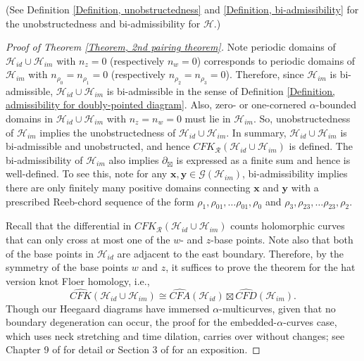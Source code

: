 \documentclass{amsart}
\theoremstyle{definition}
\theoremstyle{remark}
\numberwithin{equation}{section}
\numberwithin{equation}{section} \makeatletter
\begin{document}
\SecondPairingTheorem*
(See Definition \ref{Definition, unobstructedness} and \ref{Definition, bi-admissibility} for the unobstructedness and bi-admissibility for $\mathcal{H}$.)
\begin{proof}[Proof of Theorem \ref{Theorem, 2nd pairing theorem}]
Note periodic domains of $\mathcal{H}_{id}\cup \mathcal{H}_{im}$ with $n_z=0$ (respectively $n_w=0$) corresponds to periodic domains of $\mathcal{H}_{im}$ with $n_{\rho_0}=n_{\rho_1}=0$ (respectively $n_{\rho_2}=n_{\rho_3}=0$). Therefore,   since $\mathcal{H}_{im}$ is bi-admissible, $\mathcal{H}_{id}\cup \mathcal{H}_{im}$ is bi-admissible in the sense of Definition \ref{Definition, admissibility for doubly-pointed diagram}. Also, zero- or one-cornered $\alpha$-bounded domains in $\mathcal{H}_{id}\cup \mathcal{H}_{im}$ with $n_z=n_w=0$ must lie in $\mathcal{H}_{im}$. So, unobstructedness of $\mathcal{H}_{im}$ implies the unobstructedness of $\mathcal{H}_{id}\cup \mathcal{H}_{im}$. In summary, $\mathcal{H}_{id}\cup \mathcal{H}_{im}$ is bi-admissible and unobstructed, and hence $CFK_{\mathcal{R}}(\mathcal{H}_{id}\cup \mathcal{H}_{im})$ is defined. The bi-admissibility of $\mathcal{H}_{im}$ also implies $\partial_\boxtimes$ is expressed as a finite sum and hence is well-defined. To see this, note for any $\bm{x},\bm{y}\in\mathcal{G}(\mathcal{H}_{im})$, bi-admissibility implies there are only finitely many positive domains connecting $\bm{x}$ and $\bm{y}$ with a prescribed Reeb-chord sequence of the form $\rho_1,\rho_{01},\ldots\rho_{01},\rho_{0}$ and $\rho_3,\rho_{23},\ldots\rho_{23},\rho_{2}$.

Recall that the differential in $CFK_{\mathcal{R}}(\mathcal{H}_{id}\cup \mathcal{H}_{im})$ counts holomorphic curves that can only cross at most one of the $w$- and $z$-base points. Note also that both of the base points in $\mathcal{H}_{id}$ are adjacent to the east boundary. Therefore, by the symmetry of the base points $w$ and $z$, it suffices to prove the theorem for the hat version knot Floer homology, i.e., $$\widehat{CFK}(\mathcal{H}_{id}\cup \mathcal{H}_{im})\cong \widehat{CFA}(\mathcal{H}_{id})\boxtimes \widehat{CFD}(\mathcal{H}_{im}).$$
Though our Heegaard diagrams have immersed $\alpha$-multicurves, given that no boundary degeneration can occur, the proof for the embedded-$\alpha$-curves case, which uses neck stretching and time dilation, carries over without changes; see Chapter 9 of \cite{LOT18} for detail or Section 3 of \cite{Lipshitz2014} for an exposition.
\end{proof}
\end{document}

